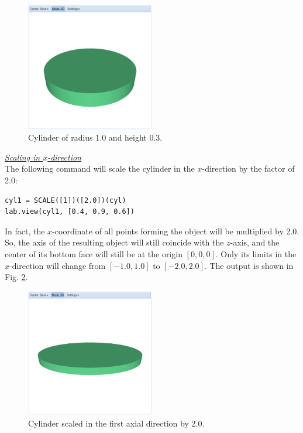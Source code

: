 \documentclass[article,A4,12pt]{llncs}
\begin{document}
\newpage

\begin{figure}[!ht]
\begin{center}
\includegraphics[width=0.5\textwidth]{img/scale-0.png}
\end{center}
\vspace{-2mm}
\caption{Cylinder of radius 1.0 and height 0.3.}
\label{fig:scale-0}
\end{figure}

\noindent
\underline{\em Scaling in $x$-direction}\\

The following command will 
scale the cylinder in the $x$-direction by the factor of 2.0: 

\begin{verbatim}
cyl1 = SCALE([1])([2.0])(cyl)
lab.view(cyl1, [0.4, 0.9, 0.6])
\end{verbatim}
In fact, the $x$-coordinate of all points forming 
the object will be multiplied by 2.0. So, the axis of the resulting object will still
coincide with the $z$-axis, and the center of its bottom face will
still be at the origin $[0, 0, 0]$. Only its limits in the $x$-direction will change 
from $[-1.0, 1.0]$ to $[-2.0, 2.0]$.
The output is shown in Fig. \ref{fig:scale-1}.

\newpage

\begin{figure}[!ht]
\begin{center}
\includegraphics[width=0.5\textwidth]{img/scale-1.png}
\end{center}
\vspace{-2mm}
\caption{Cylinder scaled in the first axial direction by 2.0.}
\label{fig:scale-1}
\end{figure}
\end{document}
